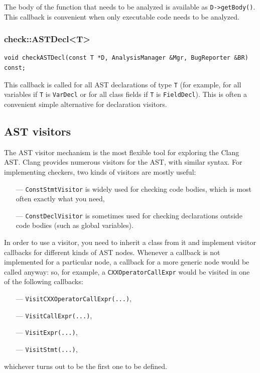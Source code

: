 \documentclass[a4paper,12pt]{article}
\newenvironment{nobr}{\begin{minipage}{\textwidth}\setlength\parskip{1em}
}{\end{minipage}\ignorespacesafterend}
\begin{document}
The body of the function that needs to be analyzed is available as \lstinline|D->getBody()|. This callback is convenient when only executable code needs to be analyzed.

\begin{nobr}
\subsubsection{check::ASTDecl<T>}

\begin{lstlisting}[style=cplusplus,numbers=none]
void checkASTDecl(const T *D, AnalysisManager &Mgr, BugReporter &BR) const;
\end{lstlisting}


This callback is called for all AST declarations of type \lstinline|T| (for example, for all variables if \lstinline|T| is \lstinline|VarDecl| or for all class fields if \lstinline|T| is \lstinline|FieldDecl|). This is often a convenient simple alternative for declaration visitors.
\end{nobr}

\subsection{AST visitors}

The AST visitor mechanism is the most flexible tool for exploring the Clang AST. Clang provides numerous visitors for the AST, with similar syntax. For implementing checkers, two kinds of visitors are mostly useful:
\begin{itemize}
 \item[---]\lstinline|ConstStmtVisitor| is widely used for checking code bodies, which is most often exactly what you need,
 \item[---]\lstinline|ConstDeclVisitor| is sometimes used for checking declarations outside code bodies (such as global variables).
\end{itemize}

In order to use a visitor, you need to inherit a class from it and implement visitor callbacks for different kinds of AST nodes. Whenever a callback is not implemented for a particular node, a callback for a more generic node would be called anyway: so, for example, a \lstinline|CXXOperatorCallExpr| would be visited in one of the following callbacks:
\begin{itemize}
\item[---]\lstinline|VisitCXXOperatorCallExpr(...)|,
\item[---]\lstinline|VisitCallExpr(...)|,
\item[---]\lstinline|VisitExpr(...)|,
\item[---]\lstinline|VisitStmt(...)|,
\end{itemize}
whichever turns out to be the first one to be defined.
\end{document}
